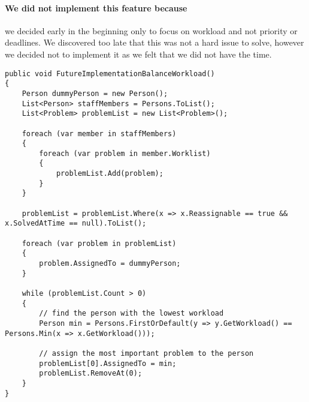 \paragraph{We did not implement this feature because} we decided early in the beginning only to focus on workload and not priority or deadlines. We discovered too late that this was not a hard issue to solve, however we decided not to implement it as we felt that we did not have the time.

\begin{lstlisting}[style=sourceCode, caption=\myCaption{A possible future implementation of the \me{BalanceWorkload} algorithm.}, label=lst:futureimplementationbalanceworkload]
public void FutureImplementationBalanceWorkload()
{
    Person dummyPerson = new Person();
    List<Person> staffMembers = Persons.ToList();
    List<Problem> problemList = new List<Problem>();

    foreach (var member in staffMembers)
    {
        foreach (var problem in member.Worklist)
        {
            problemList.Add(problem);
        }
    }

    problemList = problemList.Where(x => x.Reassignable == true && x.SolvedAtTime == null).ToList();

    foreach (var problem in problemList)
    {
        problem.AssignedTo = dummyPerson;
    }

    while (problemList.Count > 0)
    {
        // find the person with the lowest workload
        Person min = Persons.FirstOrDefault(y => y.GetWorkload() == Persons.Min(x => x.GetWorkload()));

        // assign the most important problem to the person
        problemList[0].AssignedTo = min;
        problemList.RemoveAt(0);
    }
}
\end{lstlisting}


